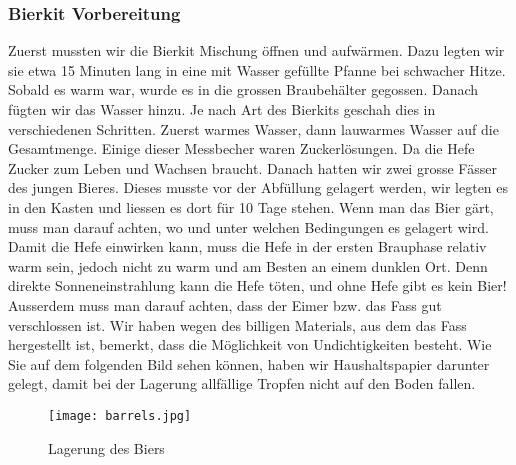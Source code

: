\subsubsection{Bierkit Vorbereitung}
Zuerst mussten wir die Bierkit Mischung öffnen und aufwärmen. Dazu legten wir
sie etwa 15 Minuten lang in eine mit Wasser gefüllte Pfanne bei schwacher Hitze. Sobald es warm war,
wurde es in die grossen Braubehälter gegossen. Danach fügten wir das Wasser hinzu. Je nach Art des Bierkits
geschah dies in verschiedenen Schritten. Zuerst warmes Wasser, dann lauwarmes Wasser auf die Gesamtmenge.
Einige dieser Messbecher waren Zuckerlösungen. Da die Hefe Zucker zum Leben und Wachsen braucht.
Danach hatten wir zwei grosse Fässer des jungen Bieres.
Dieses musste vor der Abfüllung gelagert werden, wir legten es in den Kasten und liessen es dort für 10 Tage stehen.
Wenn man das Bier gärt, muss man darauf achten, wo und unter welchen Bedingungen es gelagert wird.
Damit die Hefe einwirken kann, muss die Hefe in der ersten Brauphase relativ warm sein, jedoch nicht zu warm und am Besten an einem dunklen Ort. 
Denn direkte Sonneneinstrahlung kann die Hefe töten, und ohne Hefe gibt es kein Bier!
Ausserdem muss man darauf achten, dass der Eimer bzw. das Fass gut verschlossen ist. Wir haben wegen des billigen Materials,
aus dem das Fass hergestellt ist, bemerkt, dass die Möglichkeit von Undichtigkeiten besteht. Wie Sie auf dem folgenden Bild sehen können,
haben wir Haushaltspapier darunter gelegt, damit bei der Lagerung allfällige Tropfen nicht auf den Boden fallen. 



\begin{figure}[!h]
	\centering
	\texttt{[image: barrels.jpg]}
	\caption{Lagerung des Biers}
\end{figure}
\newpage

